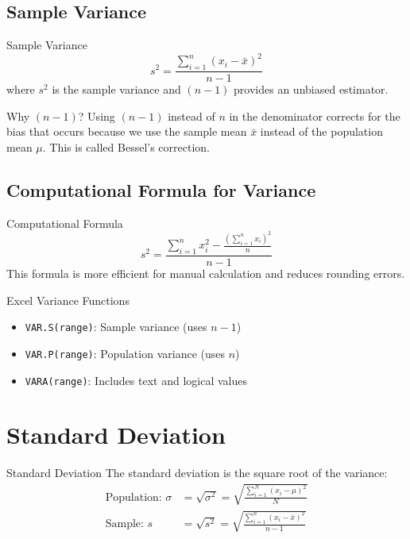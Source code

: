 \documentclass[12pt,a4paper]{book}
\begin{document}
\subsection{Sample Variance}

\begin{definition}{Sample Variance}
\[
s^2 = \frac{\sum_{i=1}^{n} (x_i - \bar{x})^2}{n-1}
\]
where $s^2$ is the sample variance and $(n-1)$ provides an unbiased estimator.
\end{definition}

\begin{note}{Why $(n-1)$?}
Using $(n-1)$ instead of $n$ in the denominator corrects for the bias that occurs because we use the sample mean $\bar{x}$ instead of the population mean $\mu$. This is called Bessel's correction.
\end{note}

\subsection{Computational Formula for Variance}

\begin{definition}{Computational Formula}
\[
s^2 = \frac{\sum_{i=1}^{n} x_i^2 - \frac{(\sum_{i=1}^{n} x_i)^2}{n}}{n-1}
\]
This formula is more efficient for manual calculation and reduces rounding errors.
\end{definition}

\begin{example}{Excel Variance Functions}
\begin{itemize}
    \item \texttt{VAR.S(range)}: Sample variance (uses $n-1$)
    \item \texttt{VAR.P(range)}: Population variance (uses $n$)
    \item \texttt{VARA(range)}: Includes text and logical values
\end{itemize}
\end{example}

\section{Standard Deviation}

\begin{definition}{Standard Deviation}
The standard deviation is the square root of the variance:
\begin{align}
\text{Population: } \sigma &= \sqrt{\sigma^2} = \sqrt{\frac{\sum_{i=1}^{N} (x_i - \mu)^2}{N}}\\
\text{Sample: } s &= \sqrt{s^2} = \sqrt{\frac{\sum_{i=1}^{n} (x_i - \bar{x})^2}{n-1}}
\end{align}
\end{definition}
\end{document}
